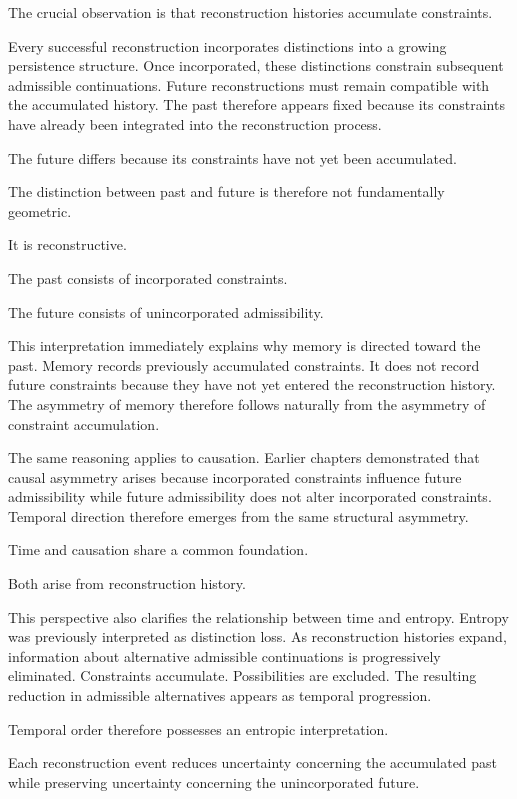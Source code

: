 \documentclass[12pt,oneside]{article}
\theoremstyle{definition}
\begin{document}
The crucial observation is that reconstruction histories accumulate constraints.

Every successful reconstruction incorporates distinctions into a growing persistence structure. Once incorporated, these distinctions constrain subsequent admissible continuations. Future reconstructions must remain compatible with the accumulated history. The past therefore appears fixed because its constraints have already been integrated into the reconstruction process.

The future differs because its constraints have not yet been accumulated.

The distinction between past and future is therefore not fundamentally geometric.

It is reconstructive.

The past consists of incorporated constraints.

The future consists of unincorporated admissibility.

This interpretation immediately explains why memory is directed toward the past. Memory records previously accumulated constraints. It does not record future constraints because they have not yet entered the reconstruction history. The asymmetry of memory therefore follows naturally from the asymmetry of constraint accumulation.

The same reasoning applies to causation. Earlier chapters demonstrated that causal asymmetry arises because incorporated constraints influence future admissibility while future admissibility does not alter incorporated constraints. Temporal direction therefore emerges from the same structural asymmetry.

Time and causation share a common foundation.

Both arise from reconstruction history.

This perspective also clarifies the relationship between time and entropy. Entropy was previously interpreted as distinction loss. As reconstruction histories expand, information about alternative admissible continuations is progressively eliminated. Constraints accumulate. Possibilities are excluded. The resulting reduction in admissible alternatives appears as temporal progression.

Temporal order therefore possesses an entropic interpretation.

Each reconstruction event reduces uncertainty concerning the accumulated past while preserving uncertainty concerning the unincorporated future.
\end{document}
